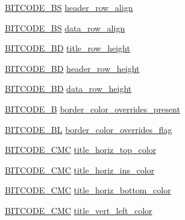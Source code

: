 \begin{DoxyCompactItemize}
\item 
\hyperlink{dwg_8h_a94297606fbd4a4ff97e8add284af0809}{\-B\-I\-T\-C\-O\-D\-E\-\_\-\-B\-S} \hyperlink{struct__dwg__entity__TABLE_aeb9c07da5f01d58da2b2e07b7d9282c3}{header\-\_\-row\-\_\-align}
\item 
\hyperlink{dwg_8h_a94297606fbd4a4ff97e8add284af0809}{\-B\-I\-T\-C\-O\-D\-E\-\_\-\-B\-S} \hyperlink{struct__dwg__entity__TABLE_a2d69878fe28deb420f86901ad4b5fc5e}{data\-\_\-row\-\_\-align}
\item 
\hyperlink{dwg_8h_a3c1e6781466b74ba07785d57da70ed97}{\-B\-I\-T\-C\-O\-D\-E\-\_\-\-B\-D} \hyperlink{struct__dwg__entity__TABLE_a2620ace132d438b4386ed1d0c57460e9}{title\-\_\-row\-\_\-height}
\item 
\hyperlink{dwg_8h_a3c1e6781466b74ba07785d57da70ed97}{\-B\-I\-T\-C\-O\-D\-E\-\_\-\-B\-D} \hyperlink{struct__dwg__entity__TABLE_a2e07f27e9007196daf388cce439dc00e}{header\-\_\-row\-\_\-height}
\item 
\hyperlink{dwg_8h_a3c1e6781466b74ba07785d57da70ed97}{\-B\-I\-T\-C\-O\-D\-E\-\_\-\-B\-D} \hyperlink{struct__dwg__entity__TABLE_a3d0822856ef6df4970d9e5234ce1f67b}{data\-\_\-row\-\_\-height}
\item 
\hyperlink{dwg_8h_ab533b1f62d9086749e3bb5b67e9f224e}{\-B\-I\-T\-C\-O\-D\-E\-\_\-\-B} \hyperlink{struct__dwg__entity__TABLE_a3be772829f67ab887def73f0e46e88cb}{border\-\_\-color\-\_\-overrides\-\_\-present}
\item 
\hyperlink{dwg_8h_aebd5f127038868cbabc3d55d91da776c}{\-B\-I\-T\-C\-O\-D\-E\-\_\-\-B\-L} \hyperlink{struct__dwg__entity__TABLE_af3e2acbaaf6df8d4f3e1c84ef961c91f}{border\-\_\-color\-\_\-overrides\-\_\-flag}
\item 
\hyperlink{dwg_8h_add86ce54dd5e62c8f7f5a870b467919a}{\-B\-I\-T\-C\-O\-D\-E\-\_\-\-C\-M\-C} \hyperlink{struct__dwg__entity__TABLE_a93ee6cb371b63d7ed7ef5512d932c488}{title\-\_\-horiz\-\_\-top\-\_\-color}
\item 
\hyperlink{dwg_8h_add86ce54dd5e62c8f7f5a870b467919a}{\-B\-I\-T\-C\-O\-D\-E\-\_\-\-C\-M\-C} \hyperlink{struct__dwg__entity__TABLE_a1772e6930a23363b640501cc544db7bc}{title\-\_\-horiz\-\_\-ins\-\_\-color}
\item 
\hyperlink{dwg_8h_add86ce54dd5e62c8f7f5a870b467919a}{\-B\-I\-T\-C\-O\-D\-E\-\_\-\-C\-M\-C} \hyperlink{struct__dwg__entity__TABLE_ac1840abe3e28abf6f8d796467ae6cbc8}{title\-\_\-horiz\-\_\-bottom\-\_\-color}
\item 
\hyperlink{dwg_8h_add86ce54dd5e62c8f7f5a870b467919a}{\-B\-I\-T\-C\-O\-D\-E\-\_\-\-C\-M\-C} \hyperlink{struct__dwg__entity__TABLE_a4f0485f1ade8132528f201f9530dc1ce}{title\-\_\-vert\-\_\-left\-\_\-color}

\end{DoxyCompactItemize}
